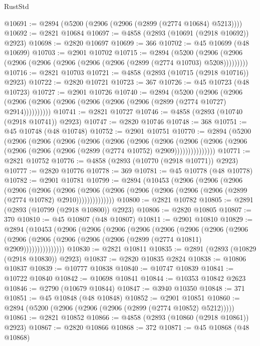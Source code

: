 \begin{lexlean}{RustStd}
\begin{coremodule}
@10691 := @2894 (@5200 (@2906 (@2906 (@2899 (@2774 @10684) @5213))))
@10692 := @2821 @10684
@10697 := @4858 (@2893 (@10691 (@2918 @10692)) @2923)
@10698 := @2820 @10697
@10699 := 366
@10702 := @45 @10699 (@48 @10699)
@10703 := @2901 @10702
@10715 := @2894
    (@5200 (@2906 (@2906 (@2906 (@2906 (@2906 (@2906 (@2906 (@2899 (@2774 @10703) @5208)))))))))
@10716 := @2821 @10703
@10721 := @4858 (@2893 (@10715 (@2918 @10716)) @2923)
@10722 := @2820 @10721
@10723 := 367
@10726 := @45 @10723 (@48 @10723)
@10727 := @2901 @10726
@10740 := @2894
    (@5200
      (@2906 (@2906 (@2906 (@2906 (@2906 (@2906 (@2906 (@2906 (@2899 (@2774 @10727) @2914))))))))))
@10741 := @2821 @10727
@10746 := @4858 (@2893 (@10740 (@2918 @10741)) @2923)
@10747 := @2820 @10746
@10748 := 368
@10751 := @45 @10748 (@48 @10748)
@10752 := @2901 @10751
@10770 := @2894
    (@5200
      (@2906
        (@2906
          (@2906
            (@2906
              (@2906
                (@2906
                  (@2906
                    (@2906
                      (@2906 (@2906 (@2906 (@2906 (@2906 (@2899 (@2774 @10752) @2909)))))))))))))))
@10771 := @2821 @10752
@10776 := @4858 (@2893 (@10770 (@2918 @10771)) @2923)
@10777 := @2820 @10776
@10778 := 369
@10781 := @45 @10778 (@48 @10778)
@10782 := @2901 @10781
@10799 := @2894
    (@10453
      (@2906
        (@2906
          (@2906
            (@2906
              (@2906
                (@2906
                  (@2906
                    (@2906 (@2906 (@2906 (@2906 (@2906 (@2899 (@2774 @10782) @2910))))))))))))))
@10800 := @2821 @10782
@10805 := @2891 (@2893 (@10799 (@2918 @10800)) @2923)
@10806 := @2820 @10805
@10807 := 370
@10810 := @45 @10807 (@48 @10807)
@10811 := @2901 @10810
@10829 := @2894
    (@10453
      (@2906
        (@2906
          (@2906
            (@2906
              (@2906
                (@2906
                  (@2906
                    (@2906
                      (@2906 (@2906 (@2906 (@2906 (@2906 (@2899 (@2774 @10811) @2909)))))))))))))))
@10830 := @2821 @10811
@10835 := @2891 (@2893 (@10829 (@2918 @10830)) @2923)
@10837 := @2820 @10835 @2824
@10838 := @10806 @10837
@10839 := @10777 @10838
@10840 := @10747 @10839
@10841 := @10722 @10840
@10842 := @10698 @10841
@10844 := @10353 @10842 @2623
@10846 := @2790 (@10679 @10844)
@10847 := @3940 @10350
@10848 := 371
@10851 := @45 @10848 (@48 @10848)
@10852 := @2901 @10851
@10860 := @2894 (@5200 (@2906 (@2906 (@2906 (@2899 (@2774 @10852) @5212)))))
@10861 := @2821 @10852
@10866 := @4858 (@2893 (@10860 (@2918 @10861)) @2923)
@10867 := @2820 @10866
@10868 := 372
@10871 := @45 @10868 (@48 @10868)

\end{coremodule}
\end{lexlean}
